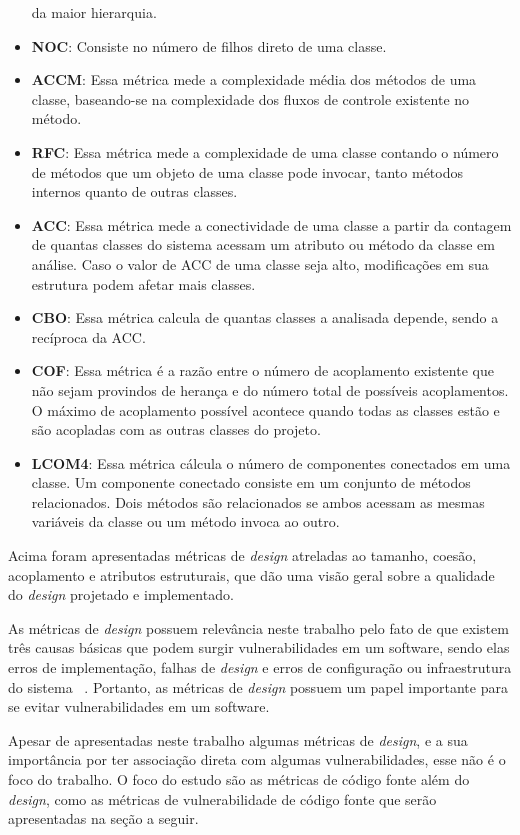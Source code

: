 \begin{itemize}
    da maior hierarquia.
  \item \textbf{NOC}: Consiste no número de filhos direto de uma classe.
  \item \textbf{ACCM}: Essa métrica mede a complexidade média dos métodos de uma classe, baseando-se na complexidade dos fluxos 
    de controle existente no método.
  \item \textbf{RFC}: Essa métrica mede a complexidade de uma classe contando o número de métodos que um objeto de uma classe 
    pode invocar, tanto métodos internos quanto de outras classes.
  \item \textbf{ACC}: Essa métrica mede a conectividade de uma classe a partir da contagem de quantas classes do sistema 
    acessam um atributo ou método da classe em análise. Caso o valor de ACC de uma classe seja alto, modificações em sua 
    estrutura podem afetar mais classes.
  \item \textbf{CBO}: Essa métrica calcula de quantas classes a analisada depende, sendo a recíproca da ACC.
  \item \textbf{COF}: Essa métrica é a razão entre o número de acoplamento existente que não sejam provindos de herança e do 
    número total de possíveis acoplamentos. O máximo de acoplamento possível acontece quando todas as classes estão e são 
    acopladas com as outras classes do projeto.
  \item \textbf{LCOM4}: Essa métrica cálcula o número de componentes conectados em uma classe. Um componente conectado consiste 
    em um conjunto de métodos relacionados. Dois métodos são relacionados se ambos acessam as mesmas variáveis da classe ou um 
    método invoca ao outro.
\end{itemize}

Acima foram apresentadas métricas de \textit{design} atreladas ao tamanho,
coesão, acoplamento e atributos estruturais, que dão uma
visão geral sobre a qualidade do \textit{design} projetado e implementado.

As métricas de \textit{design} possuem relevância neste trabalho pelo fato de que existem três causas básicas que podem surgir 
vulnerabilidades em um software, sendo elas erros de implementação, falhas de
\textit{design} e erros de configuração ou infraestrutura
do sistema ~\cite{malerba2010}. Portanto, as métricas de \textit{design} possuem um papel importante para se 
evitar vulnerabilidades em um software.

Apesar de apresentadas neste trabalho algumas métricas de \textit{design}, e a sua importância por ter associação direta com algumas 
vulnerabilidades, esse não é o foco do trabalho. O foco do estudo são as
métricas de código fonte além do \textit{design}, como as métricas de vulnerabilidade de código fonte que serão 
apresentadas na seção a seguir.

